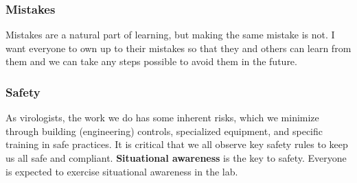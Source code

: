 \documentclass[10pt, letterpaper, twocolumn]{article} %
\begin{document}
\subsubsection{Mistakes}
Mistakes are a natural part of learning, but making the same mistake is not. I want everyone to own up to their mistakes so that they and others can learn from them and we can take any steps possible to avoid them in the future.

\subsubsection{Safety}
As virologists, the work we do has some inherent risks, which we minimize through building (engineering) controls, specialized equipment, and specific training in safe practices. It is critical that we all observe key safety rules to keep us all safe and compliant.\newline \newline
{\bfseries Situational awareness} is the key to safety. Everyone is expected to exercise situational awareness in the lab.
\end{document}
